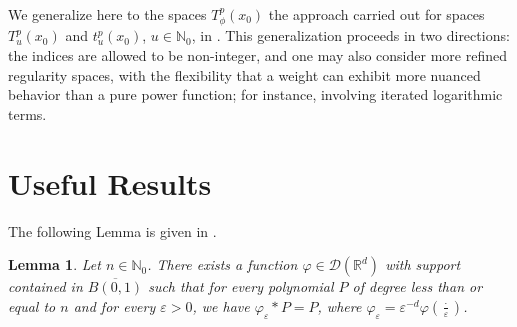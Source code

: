 \documentclass[a4paper,10pt]{article}
\theoremstyle{thmstyleone}%
\theoremstyle{thmstyletwo}%
\newtheorem{lemma}{Lemma}%
\theoremstyle{thmstylethree}%
\begin{document}
We generalize here to the spaces $T^p_\phi(x_0)$ the approach carried out for spaces $T^p_u(x_0)$ and $t^p_u(x_0)$, $u \in \mathbb{N}_0$, in \cite{Ziemer:89}. This generalization proceeds in two directions: the indices are allowed to be non-integer, and one may also consider more refined regularity spaces, with the flexibility that a weight can exhibit more nuanced behavior than a pure power function; for instance, involving iterated logarithmic terms.



\section{Useful Results}\label{sec3}

The following Lemma is given in \cite{Ziemer:89}.
\begin{lemma}\label{lemme avec fonction test conv poly est le poly}
Let $n \in \mathbb{N}_0$. There exists a function $\varphi \in \mathcal{D}(\mathbb{R}^d)$ with support contained in $\overline{B(0,1)}$ such that for every polynomial $P$ of degree less than or equal to $n$ and for every $\varepsilon > 0$, we have $\varphi_\varepsilon \ast P = P$, where $\varphi_\varepsilon = \varepsilon^{-d} \varphi\left(\frac{\cdot}{\varepsilon}\right)$.
\end{lemma}
\end{document}
